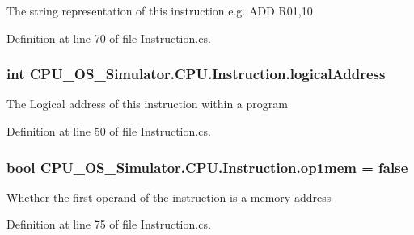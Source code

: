 The string representation of this instruction e.\+g. A\+D\+D R01,10 



Definition at line 70 of file Instruction.\+cs.

\hypertarget{class_c_p_u___o_s___simulator_1_1_c_p_u_1_1_instruction_a6577ac8b9582e24ec928bd4b59093960}{}
\subsubsection[{logical\+Address}]{\setlength{\rightskip}{0pt plus 5cm}int C\+P\+U\+\_\+\+O\+S\+\_\+\+Simulator.\+C\+P\+U.\+Instruction.\+logical\+Address\hspace{0.3cm}{\ttfamily [private]}}\label{class_c_p_u___o_s___simulator_1_1_c_p_u_1_1_instruction_a6577ac8b9582e24ec928bd4b59093960}


The Logical address of this instruction within a program 



Definition at line 50 of file Instruction.\+cs.

\hypertarget{class_c_p_u___o_s___simulator_1_1_c_p_u_1_1_instruction_ad39c82c478ef1de45aae7cf7cf38575b}{}
\subsubsection[{op1mem}]{\setlength{\rightskip}{0pt plus 5cm}bool C\+P\+U\+\_\+\+O\+S\+\_\+\+Simulator.\+C\+P\+U.\+Instruction.\+op1mem = false\hspace{0.3cm}{\ttfamily [private]}}\label{class_c_p_u___o_s___simulator_1_1_c_p_u_1_1_instruction_ad39c82c478ef1de45aae7cf7cf38575b}


Whether the first operand of the instruction is a memory address 



Definition at line 75 of file Instruction.\+cs.

